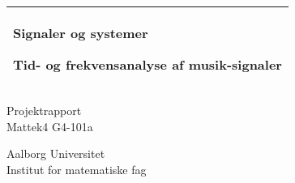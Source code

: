 %
%
%
%
%
\begin{titlepage}
  \addtolength{\hoffset}{0.5\evensidemargin-0.5\oddsidemargin} %
  \noindent%
  \begin{tabular}{@{}p{\textwidth}@{}}
    \toprule[2pt]
    \midrule
    \vspace{0.2cm}
    \begin{center}
    \Huge{\textbf{
      Signaler og systemer
    }}
    \end{center}
    \begin{center}
      \Large{
        Tid- og frekvensanalyse af musik-signaler %
      }
    \end{center}
    \vspace{0.2cm}\\
    \midrule
    \toprule[2pt]
  \end{tabular}
  \begin{center}
    {\large
      Projektrapport
    }\\
    \vspace{0.2cm}
    {\Large
      Mattek4 G4-101a
    }
  \end{center}



  \begin{center}
  Aalborg Universitet\\
Institut for matematiske fag
  \end{center}
\end{titlepage}
\clearpage
